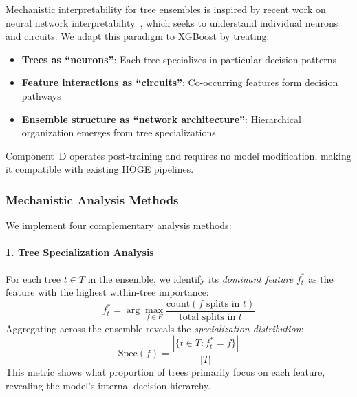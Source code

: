 Mechanistic interpretability for tree ensembles is inspired by recent work on neural network interpretability~\cite{olah2020, anthropic2023}, which seeks to understand individual neurons and circuits. We adapt this paradigm to XGBoost by treating:
\begin{itemize}
    \item \textbf{Trees as ``neurons''}: Each tree specializes in particular decision patterns
    \item \textbf{Feature interactions as ``circuits''}: Co-occurring features form decision pathways
    \item \textbf{Ensemble structure as ``network architecture''}: Hierarchical organization emerges from tree specializations
\end{itemize}

Component~D operates post-training and requires no model modification, making it compatible with existing HOGE pipelines.

\subsubsection{Mechanistic Analysis Methods}

We implement four complementary analysis methods:

\paragraph{1. Tree Specialization Analysis}
For each tree $t \in T$ in the ensemble, we identify its \emph{dominant feature} $f^*_t$ as the feature with the highest within-tree importance:
\begin{equation}
f^*_t = \arg\max_{f \in F} \frac{\text{count}(f \text{ splits in } t)}{\text{total splits in } t}
\end{equation}
Aggregating across the ensemble reveals the \emph{specialization distribution}:
\begin{equation}
\text{Spec}(f) = \frac{|\{t \in T : f^*_t = f\}|}{|T|}
\end{equation}
This metric shows what proportion of trees primarily focus on each feature, revealing the model's internal decision hierarchy.

